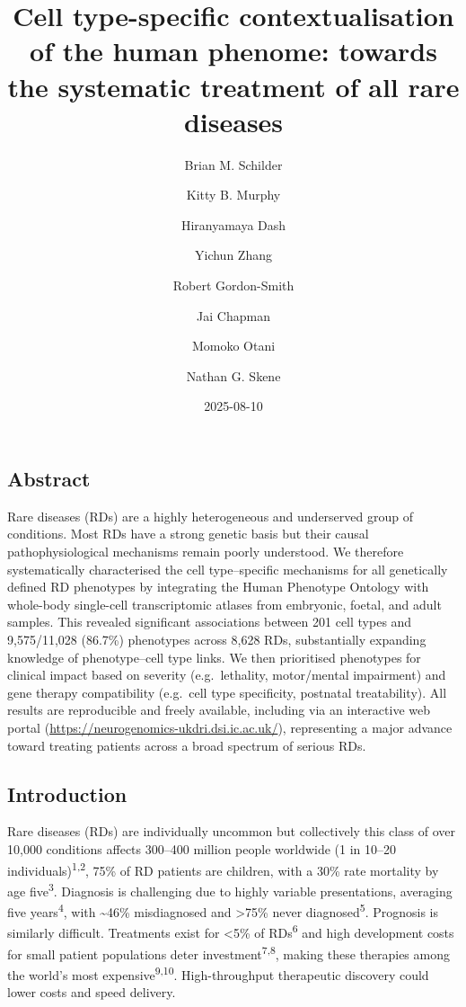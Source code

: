 \documentclass[
]{article}
\title{Cell type-specific contextualisation of the human phenome:
towards the systematic treatment of all rare diseases}
\author{Brian M. Schilder \and Kitty B. Murphy \and Hiranyamaya
Dash \and Yichun Zhang \and Robert Gordon-Smith \and Jai
Chapman \and Momoko Otani \and Nathan G. Skene}
\date{2025-08-10}
\begin{document}
\maketitle


\newpage

\subsection{Abstract}\label{abstract}

Rare diseases (RDs) are a highly heterogeneous and underserved group of
conditions. Most RDs have a strong genetic basis but their causal
pathophysiological mechanisms remain poorly understood. We therefore
systematically characterised the cell type--specific mechanisms for all
genetically defined RD phenotypes by integrating the Human Phenotype
Ontology with whole-body single-cell transcriptomic atlases from
embryonic, foetal, and adult samples. This revealed significant
associations between 201 cell types and 9,575/11,028 (86.7\%) phenotypes
across 8,628 RDs, substantially expanding knowledge of phenotype--cell
type links. We then prioritised phenotypes for clinical impact based on
severity (e.g.~lethality, motor/mental impairment) and gene therapy
compatibility (e.g.~cell type specificity, postnatal treatability). All
results are reproducible and freely available, including via an
interactive web portal
(\url{https://neurogenomics-ukdri.dsi.ic.ac.uk/}), representing a major
advance toward treating patients across a broad spectrum of serious RDs.

\subsection{Introduction}\label{sec-introduction}

Rare diseases (RDs) are individually uncommon but collectively this
class of over 10,000 conditions affects 300--400 million people
worldwide (1 in 10--20 individuals)\textsuperscript{1,2}, 75\% of RD
patients are children, with a 30\% rate mortality by age
five\textsuperscript{3}. Diagnosis is challenging due to highly variable
presentations, averaging five years\textsuperscript{4}, with
\textasciitilde46\% misdiagnosed and \textgreater75\% never
diagnosed\textsuperscript{5}. Prognosis is similarly difficult.
Treatments exist for \textless5\% of RDs\textsuperscript{6} and high
development costs for small patient populations deter
investment\textsuperscript{7,8}, making these therapies among the
world's most expensive\textsuperscript{9,10}. High-throughput
therapeutic discovery could lower costs and speed delivery.
\end{document}
